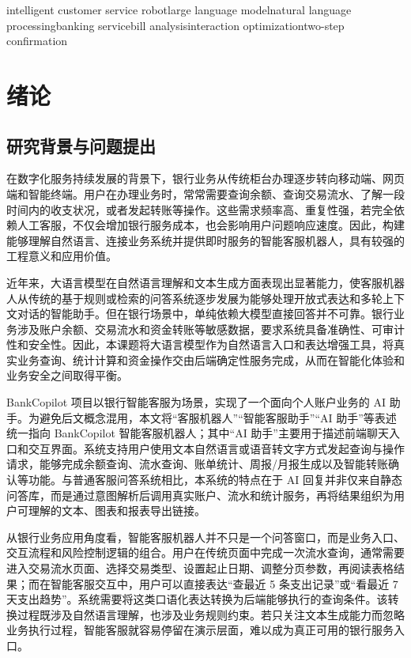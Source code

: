 \documentclass[bachelor, print]{xduthesis}
\begin{document}
\begin{ekeywords}
intelligent customer service robot\quad large language model\quad natural language processing\quad banking service\quad bill analysis\quad interaction optimization\quad two-step confirmation
\end{ekeywords}

\makecover

\tableofcontents

\mainmatter

\chapter{绪论}

\section{研究背景与问题提出}

在数字化服务持续发展的背景下，银行业务从传统柜台办理逐步转向移动端、网页端和智能终端。用户在办理业务时，常常需要查询余额、查询交易流水、了解一段时间内的收支状况，或者发起转账等操作。这些需求频率高、重复性强，若完全依赖人工客服，不仅会增加银行服务成本，也会影响用户问题响应速度。因此，构建能够理解自然语言、连接业务系统并提供即时服务的智能客服机器人，具有较强的工程意义和应用价值。

近年来，大语言模型在自然语言理解和文本生成方面表现出显著能力，使客服机器人从传统的基于规则或检索的问答系统逐步发展为能够处理开放式表达和多轮上下文对话的智能助手\cite{zhao2023survey}。但在银行场景中，单纯依赖大模型直接回答并不可靠。银行业务涉及账户余额、交易流水和资金转账等敏感数据，要求系统具备准确性、可审计性和安全性。因此，本课题将大语言模型作为自然语言入口和表达增强工具，将真实业务查询、统计计算和资金操作交由后端确定性服务完成，从而在智能化体验和业务安全之间取得平衡。

BankCopilot 项目以银行智能客服为场景，实现了一个面向个人账户业务的 AI 助手。为避免后文概念混用，本文将“客服机器人”“智能客服助手”“AI 助手”等表述统一指向 BankCopilot 智能客服机器人；其中“AI 助手”主要用于描述前端聊天入口和交互界面。系统支持用户使用文本自然语言或语音转文字方式发起查询与操作请求，能够完成余额查询、流水查询、账单统计、周报/月报生成以及智能转账确认等功能。与普通客服问答系统相比，本系统的特点在于 AI 回复并非仅来自静态问答库，而是通过意图解析后调用真实账户、流水和统计服务，再将结果组织为用户可理解的文本、图表和报表导出链接。

从银行业务应用角度看，智能客服机器人并不只是一个问答窗口，而是业务入口、交互流程和风险控制逻辑的组合。用户在传统页面中完成一次流水查询，通常需要进入交易流水页面、选择交易类型、设置起止日期、调整分页参数，再阅读表格结果；而在智能客服交互中，用户可以直接表达“查最近 5 条支出记录”或“看最近 7 天支出趋势”。系统需要将这类口语化表达转换为后端能够执行的查询条件。该转换过程既涉及自然语言理解，也涉及业务规则约束。若只关注文本生成能力而忽略业务执行过程，智能客服就容易停留在演示层面，难以成为真正可用的银行服务入口。
\end{document}
